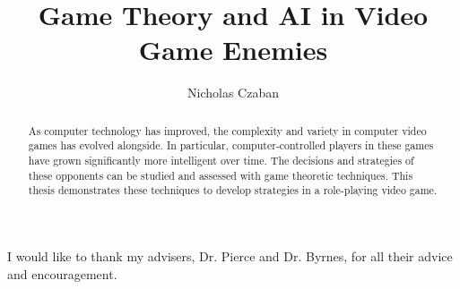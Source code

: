\documentclass[12pt,code,palatino,picins,blacklinks,kaukecopyright,openright,twoside]{woosterthesis} %
\title{Game Theory and AI in Video Game Enemies}
\author{Nicholas Czaban}
\theoremstyle{definition}
\begin{document}
%
%

\frontmatter
\maketitle
\ClearShipoutPicture
\clearpage\thispagestyle{empty}\null\clearpage
\disscopyright 

%                                                                                       
%                                                                                       

\begin{abstract}
As computer technology has improved, the complexity and variety in computer video games has evolved alongside. In particular, computer-controlled players in these games have grown significantly more intelligent over time. The decisions and strategies of these opponents can be studied and assessed with game theoretic techniques. This thesis demonstrates these techniques to develop strategies in a role-playing video game.
\end{abstract}

%                                                                                       
%                                                                                       

\dedication{}


%                                                                                       
%                                                                                       

\begin{acknowl}
I would like to thank my advisers, Dr. Pierce and Dr. Byrnes, for all their advice and encouragement. 
\end{acknowl}
\end{document}
